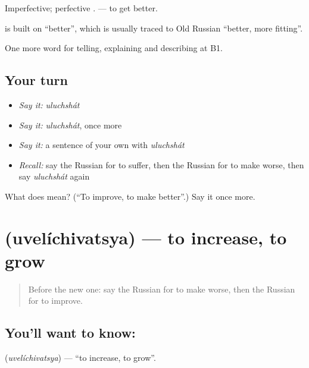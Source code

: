 Imperfective; perfective \emph{}. \emph{} — to get better.

\begin{cousinweb}
\textbf{} is built on \emph{} \textquotedblleft{}better\textquotedblright{}, which is usually traced to Old Russian \emph{} \textquotedblleft{}better, more fitting\textquotedblright{}.
\end{cousinweb}

\begin{grammarlens}[title={What you've built}]
One more word for telling, explaining and describing at B1.
\end{grammarlens}

\subsection*{Your turn}
\begin{itemize}
\raggedright
  \item \emph{Say it:} \emph{uluchshát}
  \item \emph{Say it:} \emph{uluchshát}, once more
  \item \emph{Say it:} a sentence of your own with \emph{uluchshát}
  \item \emph{Recall:} say the Russian for to suffer, then the Russian for to make worse, then say \emph{uluchshát} again
\end{itemize}

\begin{tcolorbox}[breakable,colback=teal!4,colframe=teal!35!black,title={Before you move on}]
What does  mean? (\textquotedblleft{}To improve, to make better\textquotedblright{}.) Say it once more.
\end{tcolorbox}
\section[\texorpdfstring{\ru{увеличиваться} (uvelíchivatsya)}{увеличиваться (uvelíchivatsya)}]{ (uvelíchivatsya) — to increase, to grow}

\label{lesson:RU-C354-uvelichivatsya}



\begin{quote}
Before the new one: say the Russian for to make worse, then the Russian for to improve.
\end{quote}

\subsection*{You'll want to know: }
\textbf{} (\emph{uvelíchivatsya}) — \textquotedblleft{}to increase, to grow\textquotedblright{}.

